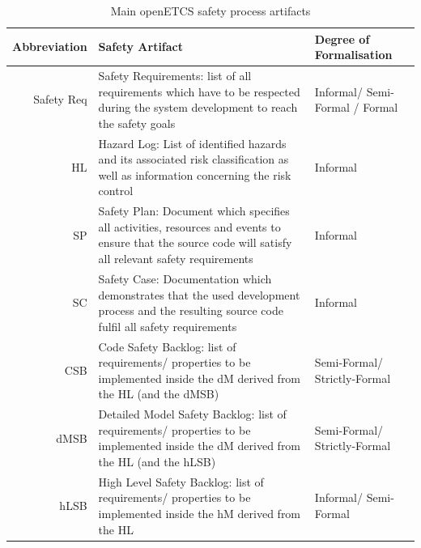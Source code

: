 \documentclass{template/openetcs_article}
\begin{document}
\begin{table}[htbp]
  \centering
  \caption{Main openETCS safety process artifacts}
    \begin{tabular}{r|p{8cm}|p{4cm}}
    \textbf{Abbreviation} & \textbf{Safety Artifact} & \textbf{Degree of Formalisation}\\
    \hline
    Safety Req & Safety Requirements: list of all requirements which have to be respected during the system development to reach the safety goals & Informal/ Semi-Formal / Formal \\
    HL    & Hazard Log: List of identified hazards and its associated risk classification as well as information concerning the risk control & Informal \\
    SP    & Safety Plan: Document which specifies all activities, resources and events to ensure that the source code will satisfy all relevant safety requirements & Informal \\
    SC    & Safety Case: Documentation which demonstrates that the used development process and the resulting source code fulfil all safety requirements & Informal \\
    CSB   & Code Safety Backlog: list of requirements/ properties to be implemented inside the dM derived from  the HL (and the dMSB) & Semi-Formal/ Strictly-Formal \\
    dMSB  & Detailed Model Safety Backlog: list of requirements/ properties to be implemented inside the dM derived from the HL (and  the hLSB) & Semi-Formal/ Strictly-Formal \\
    hLSB  & High Level Safety Backlog: list of requirements/ properties to be implemented inside the hM derived from the HL & Informal/ Semi-Formal \\
    \end{tabular}%
  \label{tab:openETCS-Safety-artifacts}%
\end{table}%
\end{document}
